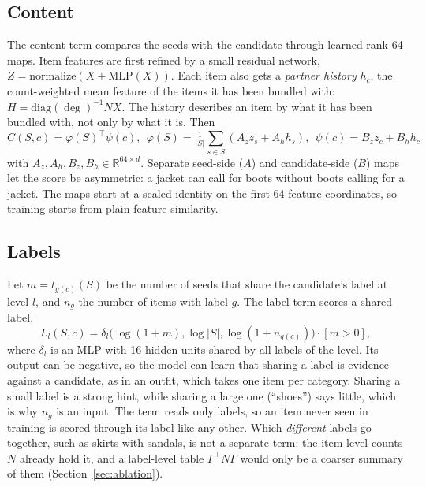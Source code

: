 \documentclass[runningheads]{llncs}
\newcommand{\R}{\mathbb{R}}
\newcommand{\deltab}{\delta}
\begin{document}
\subsection{Content}

The content term compares the seeds with the candidate through learned rank-64 maps. Item features are first refined
by a small residual network, $Z=\mathrm{normalize}(X+\mathrm{MLP}(X))$. Each item also gets a \emph{partner history}
$h_c$, the count-weighted mean feature of the items it has been bundled with: $H=\mathrm{diag}(\deg)^{-1}NX$. The
history describes an item by what it has been bundled with, not only by what it is. Then
\begin{equation}
C(S,c)=\varphi(S)^{\top}\psi(c),\ \ \varphi(S)=\tfrac{1}{|S|}\textstyle\sum_{s\in S}(A_z z_s+A_h h_s),\ \
\psi(c)=B_z z_c+B_h h_c
\end{equation}
with $A_z,A_h,B_z,B_h\in\R^{64\times d}$. Separate seed-side ($A$) and candidate-side ($B$) maps let the score be
asymmetric: a jacket can call for boots without boots calling for a jacket. The maps start at a scaled identity on
the first 64 feature coordinates, so training starts from plain feature similarity.

\subsection{Labels}

Let $m=t_{g(c)}(S)$ be the number of seeds that share the candidate's label at level $l$, and $n_g$ the number of
items with label $g$. The label term scores a shared label,
\begin{equation}
L_l(S,c)=\deltab_l\big(\log(1+m),\log|S|,\log(1+n_{g(c)})\big)\cdot[m>0],
\end{equation}
where $\deltab_l$ is an MLP with 16 hidden units shared by all labels of the level. Its output can be negative, so the
model can learn that sharing a label is evidence against a candidate, as in an outfit, which takes one item per
category. Sharing a small label is a strong hint, while sharing a large one (``shoes'') says little, which is why
$n_g$ is an input. The term reads only labels, so an item never seen in training is scored through its label like any
other. Which \emph{different} labels go together, such as skirts with sandals, is not a separate term: the item-level
counts $N$ already hold it, and a label-level table $\Gamma^{\top}N\Gamma$ would only be a coarser summary of them
(Section~\ref{sec:ablation}).
\end{document}
